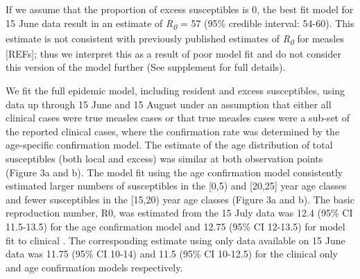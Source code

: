 If we assume that the proportion of excess susceptibles is 0, the best
fit model for 15 June data result in an estimate of
\emph{R\textsubscript{0}} = 57 (95\% credible interval: 54-60). This
estimate is not consistent with previously published estimates of
\emph{R\textsubscript{0}} for measles {[}REFs{]}; thus we interpret this
as a result of poor model fit and do not consider this version of the
model further (See supplement for full details).

We fit the full epidemic model, including resident and excess
susceptibles, using data up through 15 June and 15 August under an
assumption that either all clinical cases were true measles cases or
that true measles cases were a sub-set of the reported clinical cases,
where the confirmation rate was determined by the age-specific
confirmation model. The estimate of the age distribution of total
susceptibles (both local and excess) was similar at both observation
points (Figure 3a and b). The model fit using the age confirmation model
consistently estimated larger numbers of susceptibles in the {[}0,5) and
{[}20,25{]} year age classes and fewer susceptibles in the {[}15,20)
year age classes (Figure 3a and b). The basic reproduction number, R0,
was estimated from the 15 July data was 12.4 (95\% CI 11.5-13.5) for the
age confirmation model and 12.75 (95\% CI 12-13.5) for model fit to
clinical . The corresponding estimate using only data available on 15
June data was 11.75 (95\% CI 10-14) and 11.5 (95\% CI 10-12.5) for the
clinical only and age confirmation models respectively.